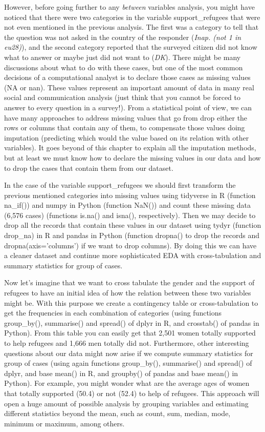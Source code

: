 However, before going further to any \textit{between} variables analysis, you might have noticed that there were two categories in the variable support\_refugees that were not even mentioned in the previous analysis. The first was a category to tell that the question was not asked in the country of the responder (\textit{Inap. (not 1 in eu28)}), and the second category reported that the surveyed citizen did not know what to answer or maybe just did not want to (\textit{DK}). There might be many discussions about what to do with these cases, but one of the most common decisions of a computational analyst is to declare those cases as missing values (NA or nan).  These values represent an important amount of data in many real social and communication analysis (just think that you cannot be forced to answer to every question in a survey!). From a statistical point of view, we can have many approaches to address missing values that go from drop either the rows or columns that contain any of them, to compensate those values doing imputation (predicting which would the value based on its relation with other variables). It goes beyond of this chapter to explain all the imputation methods, but at least we must know how to declare the missing values in our data and how to drop the cases that contain them from our dataset.

In the case of the variable support\_refugees we should first transform the previous mentioned categories into missing values using tidyverse in R (function na\_if()) and numpy in Python (function NaN()) and count these missing data (6,576 cases) (functions is.na() and isna(), respectively).   Then we may decide to drop all the records that contain these values in our dataset using tydyr (function drop\_na) in R and pandas in Python (function dropna() to drop the records and dropna(axis='columns') if we want to drop columns). By doing this we can have a cleaner dataset and continue more sophisticated EDA with cross-tabulation and summary statistics for group of cases.	



Now let's imagine that we want to cross tabulate the gender and the support of refugees to have an initial idea of how the relation between these two variables might be. With this purpose we create a contingency table or cross-tabulation to get the frequencies in each combination of categories (using functions group\_by(), summarise() and spread() of dplyr in R, and crosstab() of pandas in Python). From this table you can easily get that 2,501 women totally supported to help refugees and 1,666 men totally did not.  Furthermore, other interesting questions about our data might now arise if we compute summary statistics for group of cases (using again functions group\_by(), summarise() and spread() of dplyr, and base mean() in R, and groupby() of pandas and base mean() in Python). For example, you might wonder what are the average ages of women that totally supported (50.4) or not (52.4) to help of refugees.  This approach will open a huge amount of possible analysis by grouping variables and estimating different statistics beyond the mean, such as count, sum, median, mode, minimum or maximum, among others.

